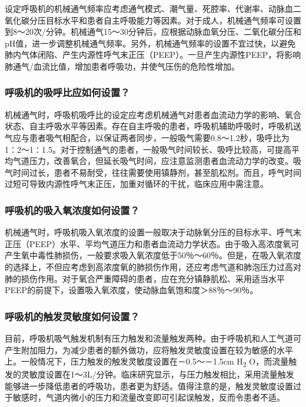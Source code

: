 设定呼吸机的机械通气频率应考虑通气模式、潮气量、死腔率、代谢率、动脉血二氧化碳分压目标水平和患者自主呼吸能力等因素。对于成人，机械通气频率可设置到8～20次/分钟。机械通气15～30分钟后，应根据动脉血氧分压、二氧化碳分压和pH值，进一步调整机械通气频率。另外，机械通气频率的设置不宜过快，以避免肺内气体闭陷、产生内源性呼气末正压（PEEP）。一旦产生内源性PEEP，将影响肺通气/血流比值，增加患者呼吸功，并使气压伤的危险性增加。

\subsubsection{呼吸机的吸呼比应如何设置？}

机械通气时，呼吸机吸呼比的设定应考虑机械通气对患者血流动力学的影响、氧合状态、自主呼吸水平等因素。存在自主呼吸的患者，呼吸机辅助呼吸时，呼吸机送气应与患者吸气相配合，以保证两者同步，一般吸气需要0.8～1.2秒，吸呼比为1∶2～1∶1.5。对于控制通气的患者，一般吸气时间较长、吸呼比较高，可提高平均气道压力，改善氧合，但延长吸气时间，应注意监测患者血流动力学的改变。吸气时间过长，患者不易耐受，往往需要使用镇静剂，甚至肌松剂。而且，呼气时间过短可导致内源性呼气末正压，加重对循环的干扰，临床应用中需注意。

\subsubsection{呼吸机的吸入氧浓度如何设置？}

机械通气时，呼吸机吸入氧浓度的设置一般取决于动脉氧分压的目标水平、呼气末正压（PEEP）水平、平均气道压力和患者血流动力学状态。由于吸入高浓度氧可产生氧中毒性肺损伤，一般要求吸入氧浓度低于50％～60％。但是，在吸入氧浓度的选择上，不但应考虑到高浓度氧的肺损伤作用，还应考虑气道和肺泡压力过高对肺的损伤作用。对于氧合严重障碍的患者，应在充分镇静肌松、采用适当水平PEEP的前提下，设置吸入氧浓度，使动脉血氧饱和度＞88％～90％。

\subsubsection{呼吸机的触发灵敏度如何设置？}

目前，呼吸机吸气触发机制有压力触发和流量触发两种。由于呼吸机和人工气道可产生附加阻力，为减少患者的额外做功，应将触发灵敏度设置在较为敏感的水平上。一般情况下，压力触发的触发灵敏度设置在－0.5～－1.5cm
H\textsubscript{2}
O，而流量触发的灵敏度设置在1～3L/分钟。临床研究显示，与压力触发相比，采用流量触发能够进一步降低患者的呼吸功，患者更为舒适。值得注意的是，触发灵敏度设置过于敏感时，气道内微小的压力和流量改变即可引起误触发，反而令患者不适。

